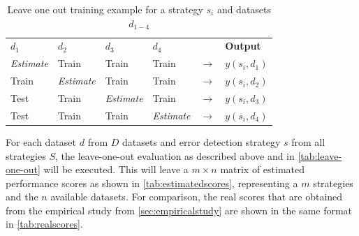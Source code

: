  \begin{table}[H]
\centering
\begin{tabular}{|l|l|l|l|l|l|}
\cline{1-4} \cline{6-6}
\textbf{$d_1$} & \textbf{$d_2$} & \textbf{$d_3$} & \textbf{$d_4$} &                 & \textbf{Output} \\ \cline{1-4} \cline{6-6} 
\textit{Estimate}          & Train         & Train         & Train         & $\rightarrow$ & $y(s_i, d_1)$      \\ \cline{1-4} \cline{6-6} 
Train         & \textit{Estimate}          & Train         & Train         & $\rightarrow$ & $y(s_i, d_2)$      \\ \cline{1-4} \cline{6-6} 
Test          & Train         & \textit{Estimate}          & Train         & $\rightarrow$ & $y(s_i, d_3)$     \\ \cline{1-4} \cline{6-6} 
Test          & Train         & Train         & \textit{Estimate}          & $\rightarrow$ & $y(s_i, d_4)$      \\ \cline{1-4} \cline{6-6} 
\end{tabular}
\caption{Leave one out training example for a strategy $s_i$ and datasets $d_{1-4}$}
\label{tab:leave-one-out}
\end{table}

For each dataset $d$ from $D$ datasets and error detection strategy $s$ from all strategies $S$, the leave-one-out evaluation as described above and in \autoref{tab:leave-one-out} will be executed. This will leave a $m \times n$ matrix of estimated performance scores as shown in \autoref{tab:estimatedscores}, representing a $m$ strategies and the $n$ available datasets.
For comparison, the real scores that are obtained from the empirical study from \autoref{sec:empiricalstudy} are shown in the same format in \autoref{tab:realscores}.

